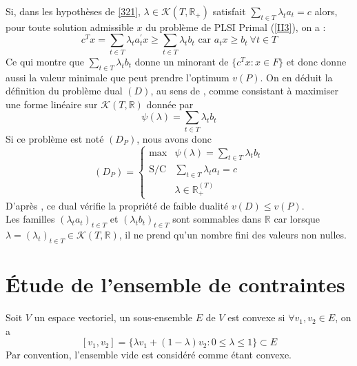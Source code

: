 \documentclass[11pt]{report}
\theoremstyle{styletheorem}
\theoremstyle{styledef}
\theoremstyle{remark}
\newcommand{\R}{\ensuremath{\mathbb{R}}}
\begin{document}
Si, dans les hypothèses  de \ref{321}, $\lambda \in \mathcal{K}(T,\R_+) $ satisfait $\sum_{t \in T} \lambda_t a_t = c$ alors, pour toute solution admissible $x$ du problème de PLSI Primal (\ref{II3}), on a :
$$c^T x = \sum_{t\in T} \lambda_t a_t^\prime x \geq \sum_{t\in T} \lambda_t b_t \text{ car } a_tx \geq  b_t \ \forall t \in T$$
Ce qui montre que $\sum_{t\in T} \lambda_t b_t$ donne un minorant de $\lbrace c^T x \colon x \in F \rbrace$ et donc donne aussi la valeur minimale que peut prendre l'optimum $v(P)$.
On en déduit la définition du problème dual $(D)$, au sens de  \cite{b16}, comme consistant à maximiser une forme linéaire sur $\mathcal{K}(T,\R)$ donnée par $$\psi (\lambda) =  \sum_{t \in T} \lambda_t b_t$$ 
Si ce problème est noté $(D_P)$, nous avons donc 
\begin{equation}\label{II4}
	(D_P) = \left \lbrace \begin{array}{ll}
		\text{max}& \psi(\lambda) = \sum_{t \in T} \lambda_t b_t \\
		\text{S/C} &\sum_{t \in T} \lambda_t a_t =c \\
		& \lambda \in \R^{(T)}_+
	\end{array}\right. 
\end{equation}
D'après \cite{b16}, ce dual vérifie la propriété de faible dualité $v(D) \leq v(P)$.\\
Les familles $(\lambda_t a_t)_{t \in T}$ et $(\lambda_t b_t)_{t \in T}$   sont sommables dans $\R$ car lorsque $\lambda = (\lambda_t)_{t \in T} \in \mathcal{K}(T,\R)$, il ne prend qu'un nombre fini des valeurs non nulles.



\section{Étude de l'ensemble de contraintes}
Soit $V$ un espace vectoriel, un sous-ensemble $E$ de $V$ est convexe si $\forall v_1, v_2 \in E$, on a  $$[v_1,v_2] = \lbrace \lambda v_1 + (1-\lambda)v_2 \colon 0 \leq \lambda\leq 1\rbrace \subset E$$
Par convention, l'ensemble vide est considéré comme étant convexe.\\
\end{document}
